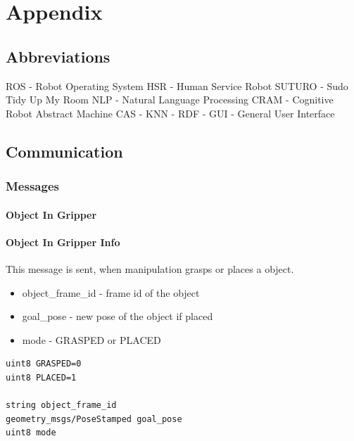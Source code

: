 \documentclass[main.tex]{subfiles}
\begin{document}
\begingroup

\renewcommand{\cleardoublepage}{}

\renewcommand{\clearpage}{}
	\newpage
	\chapter{Appendix}
		\section{Abbreviations}
		ROS - Robot Operating System
		HSR - Human Service Robot
		SUTURO - Sudo Tidy Up My Room
		NLP - Natural Language Processing
		CRAM - Cognitive Robot Abstract Machine
		CAS - 
		KNN - 
		RDF - 
		GUI - General User Interface
		\section{Communication}
			\subsection{Messages}
			\label{msgs}
				\subsubsection{Object In Gripper}\label{msg_obj_in_gripper}
				\subsubsection{Object In Gripper Info}
				This message is sent, when manipulation grasps or places a object.
				\begin{itemize}
					\item object\_frame\_id - frame id of the object
					\item goal\_pose - new pose of the object if placed
					\item mode - GRASPED or PLACED
				\end{itemize}
					\begin{lstlisting}
uint8 GRASPED=0
uint8 PLACED=1
		
string object_frame_id
geometry_msgs/PoseStamped goal_pose
uint8 mode
\end{lstlisting}
\end{document}
